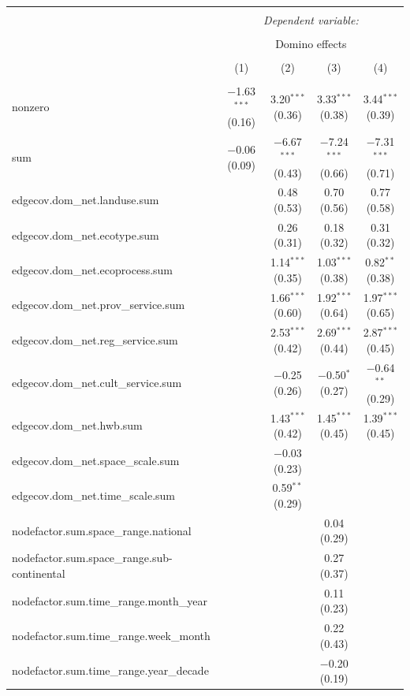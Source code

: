 \documentclass[9pt,]{article}
\begin{document}
\begin{tabular}{@{\extracolsep{5pt}}lcccc} 
\\[-1.8ex]\hline 
\hline \\[-1.8ex] 
 & \multicolumn{4}{c}{\textit{Dependent variable:}} \\ 
\cline{2-5} 
\\[-1.8ex] & \multicolumn{4}{c}{Domino effects} \\ 
\\[-1.8ex] & (1) & (2) & (3) & (4)\\ 
\hline \\[-1.8ex] 
 nonzero & $-$1.63$^{***}$ (0.16) & 3.20$^{***}$ (0.36) & 3.33$^{***}$ (0.38) & 3.44$^{***}$ (0.39) \\ 
  sum & $-$0.06 (0.09) & $-$6.67$^{***}$ (0.43) & $-$7.24$^{***}$ (0.66) & $-$7.31$^{***}$ (0.71) \\ 
  edgecov.dom\_net.landuse.sum &  & 0.48 (0.53) & 0.70 (0.56) & 0.77 (0.58) \\ 
  edgecov.dom\_net.ecotype.sum &  & 0.26 (0.31) & 0.18 (0.32) & 0.31 (0.32) \\ 
  edgecov.dom\_net.ecoprocess.sum &  & 1.14$^{***}$ (0.35) & 1.03$^{***}$ (0.38) & 0.82$^{**}$ (0.38) \\ 
  edgecov.dom\_net.prov\_service.sum &  & 1.66$^{***}$ (0.60) & 1.92$^{***}$ (0.64) & 1.97$^{***}$ (0.65) \\ 
  edgecov.dom\_net.reg\_service.sum &  & 2.53$^{***}$ (0.42) & 2.69$^{***}$ (0.44) & 2.87$^{***}$ (0.45) \\ 
  edgecov.dom\_net.cult\_service.sum &  & $-$0.25 (0.26) & $-$0.50$^{*}$ (0.27) & $-$0.64$^{**}$ (0.29) \\ 
  edgecov.dom\_net.hwb.sum &  & 1.43$^{***}$ (0.42) & 1.45$^{***}$ (0.45) & 1.39$^{***}$ (0.45) \\ 
  edgecov.dom\_net.space\_scale.sum &  & $-$0.03 (0.23) &  &  \\ 
  edgecov.dom\_net.time\_scale.sum &  & 0.59$^{**}$ (0.29) &  &  \\ 
  nodefactor.sum.space\_range.national &  &  & 0.04 (0.29) &  \\ 
  nodefactor.sum.space\_range.sub-continental &  &  & 0.27 (0.37) &  \\ 
  nodefactor.sum.time\_range.month\_year &  &  & 0.11 (0.23) &  \\ 
  nodefactor.sum.time\_range.week\_month &  &  & 0.22 (0.43) &  \\ 
  nodefactor.sum.time\_range.year\_decade &  &  & $-$0.20 (0.19) &  \\ 

\end{tabular}
\end{document}
